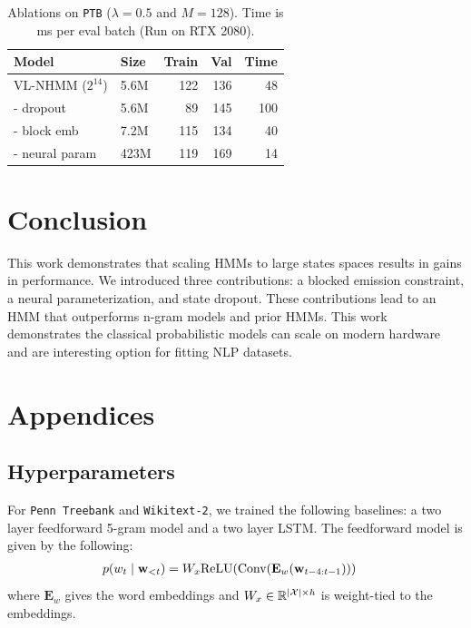 \documentclass[11pt,a4paper]{article}
\begin{document}
\begin{table}[!t]
\centering
\begin{tabular}{llrrr}
\toprule
Model                           & Size & Train  & Val  &  Time \\
\midrule
VL-NHMM ($2^{14}$)       & 5.6M       & 122    & 136  & 48\\
\quad - dropout              & 5.6M       & 89     & 145  & 100\\
\quad - block emb & 7.2M     & 115    & 134  & 40\\
\quad - neural param & 423M  & 119    & 169 & 14
\\
\bottomrule
\end{tabular}
\caption{\label{tbl:dropout-param-ablation}
Ablations on \texttt{PTB} ($\lambda =0.5$ and $M=128$). 
Time is ms per eval batch (Run on RTX 2080).
}
\end{table}


\section{Conclusion}
This work demonstrates that scaling HMMs to large states spaces results in gains in performance.
We introduced three contributions: a blocked emission constraint, a neural parameterization,
and state dropout. These contributions lead to an HMM that outperforms n-gram models and prior HMMs.
This work demonstrates the classical probabilistic models can scale on modern hardware and are
interesting option for fitting NLP datasets. 




\clearpage
\appendix

\section{Appendices}
\subsection{Hyperparameters}
\label{sec:hyperparams}

For \texttt{Penn Treebank} and \texttt{Wikitext-2}, we trained the following baselines:
a two layer feedforward 5-gram model and a two layer LSTM.
The feedforward model is given by the following:
\begin{equation}
\begin{aligned}
p(w_t \mid \mathbf{w}_{<t})
&= W_x\textrm{ReLU}(\textrm{Conv}(\mathbf{E}_w(\mathbf{w}_{t-4:t-1})))
\end{aligned}
\end{equation}
where $\mathbf{E}_w$ gives the word embeddings and
$W_x\in\mathbb{R}^{|\mathcal{X}|\times h}$ is weight-tied to the embeddings.
\end{document}
